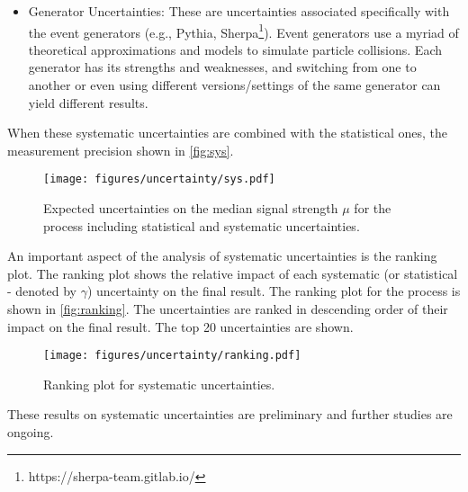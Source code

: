 \begin{itemize}

    \item Generator Uncertainties: These are uncertainties associated specifically with the event generators (e.g.,
          Pythia, Sherpa\footnote{https://sherpa-team.gitlab.io/}). Event generators use a myriad of theoretical
          approximations and models to simulate particle collisions. Each generator has its strengths and weaknesses,
          and switching from one to another or even using different versions/settings of the same generator can yield
          different results.
\end{itemize}

When these systematic uncertainties are combined with the statistical ones, the measurement precision shown in
\autoref{fig:sys}.

\begin{figure}[h]
    \centering
    \texttt{[image: figures/uncertainty/sys.pdf]}
    \caption{Expected uncertainties on the median signal strength $\mu$ for the \tth process including statistical
        and systematic uncertainties.}
    \label{fig:sys}
\end{figure}

An important aspect of the analysis of systematic uncertainties is the ranking plot. The ranking plot shows the
relative impact of each systematic (or statistical - denoted by $\gamma$) uncertainty on the final result.
The ranking plot for the \tth process is shown in \autoref{fig:ranking}. The uncertainties are ranked in descending
order of their impact on the final result. The top 20 uncertainties are shown.

\begin{figure}[h]
    \centering
    \texttt{[image: figures/uncertainty/ranking.pdf]}
    \caption{Ranking plot for systematic uncertainties.}
    \label{fig:ranking}
\end{figure}

These results on systematic uncertainties are preliminary and further studies are ongoing.
